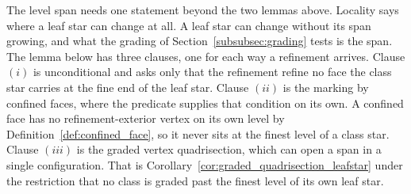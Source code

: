 \documentclass[a4paper, 12pt]{article}
\theoremstyle{definition}
\theoremstyle{plain}
\numberwithin{equation}{section}
\begin{document}
\smallskip

The level span needs one statement beyond the two lemmas above. Locality says where a leaf star can change at all. A leaf star can change without its span growing, and what the grading of Section~\ref{subsubsec:grading} tests is the span. The lemma below has three clauses, one for each way a refinement arrives. Clause $(i)$ is unconditional and asks only that the refinement refine no face the class star carries at the fine end of the leaf star. Clause $(ii)$ is the marking by confined faces, where the predicate supplies that condition on its own. A confined face has no refinement-exterior vertex on its own level by Definition~\ref{def:confined_face}, so it never sits at the finest level of a class star. Clause $(iii)$ is the graded vertex quadrisection, which can open a span in a single configuration. That is Corollary~\ref{cor:graded_quadrisection_leafstar} under the restriction that no class is graded past the finest level of its own leaf star.
\end{document}
